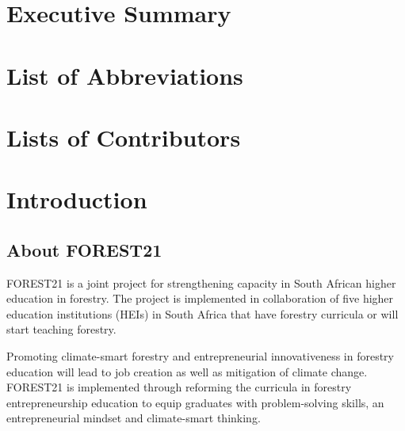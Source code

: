 \documentclass[
  11pt,
]{article}
\begin{document}
\clearpage

\renewcommand{\baselinestretch}{0.6}\normalsize
\setcounter{tocdepth}{3}
\tableofcontents
\renewcommand{\baselinestretch}{1.0}\normalsize

\clearpage

\listoffigures
\listoftables

\clearpage

\hypertarget{executive-summary}{%
\section*{Executive Summary}\label{executive-summary}}

\clearpage

\hypertarget{list-of-abbreviations}{%
\section*{List of Abbreviations}\label{list-of-abbreviations}}

\clearpage

\hypertarget{lists-of-contributors}{%
\section*{Lists of Contributors}\label{lists-of-contributors}}

\clearpage


\clearpage

\hypertarget{introduction}{%
\section{Introduction}\label{introduction}}

\hypertarget{about-forest21}{%
\subsection{About FOREST21}\label{about-forest21}}

FOREST21 is a joint project for strengthening capacity in South African
higher education in forestry. The project is implemented in
collaboration of five higher education institutions (HEIs) in South
Africa that have forestry curricula or will start teaching forestry.

Promoting climate-smart forestry and entrepreneurial innovativeness in
forestry education will lead to job creation as well as mitigation of
climate change. FOREST21 is implemented through reforming the curricula
in forestry entrepreneurship education to equip graduates with
problem-solving skills, an entrepreneurial mindset and climate-smart
thinking.
\end{document}
